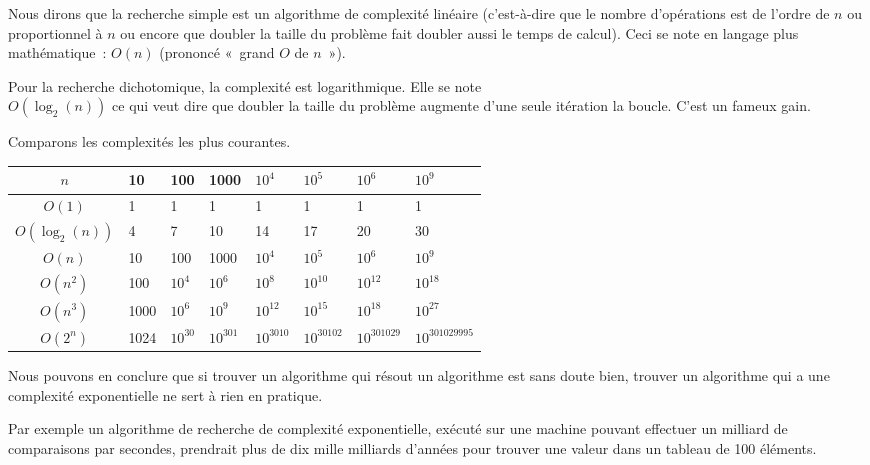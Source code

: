 			Nous dirons que la recherche simple est un algorithme de complexité
			linéaire (c’est-à-dire que le nombre d’opérations est de l’ordre de
			$n$ ou proportionnel à $n$ ou encore que doubler la taille du
			problème fait doubler aussi le temps de calcul). Ceci se note en
			langage plus mathématique~: \textbf{$O(n)$} (prononcé «~grand $O$ de
			$n$~»). 
			
			Pour la recherche dichotomique, la complexité est logarithmique.
			Elle se note \\$O(\log_2(n))$ ce qui veut dire que doubler la taille
			du problème augmente d'une seule itération la boucle. C'est un
			fameux gain. 
			
			Comparons les complexités les plus courantes.
			\begin{center}
			\small
			\begin{tabular}{|c|l|l|l|l|l|l|l|}
			\hline
			\rowcolor{black!40}
			$n$ & 10 & 100 & 1000 & $10^4$ & $10^5$ & $10^6$ & $10^9$ \\
			\hline
			$O(1)$ & 1 & 1 & 1 & 1 & 1 & 1 & 1\\
			\hline
			$O(\log_2(n))$ & 4 & 7 & 10 & 14 & 17 & 20 & 30\\
			\hline
			$O(n)$ & 10 & 100 & 1000 & $10^4$ & $10^5$ & $10^6$ & $10^9$ \\
			\hline
			$O(n^2)$ & 100 & $10^4$ & $10^6$ & $10^8$ & $10^10$ & $10^{12}$ & $10^{18}$ \\
			\hline
			$O(n^3)$ & 1000 & $10^6$ & $10^9$ & $10^{12}$ & $10^{15}$ & $10^{18}$ & $10^{27}$ \\
			\hline
			$O(2^n)$ & 1024 & $10^{30}$ & $10^{301}$ & $10^{3010}$ & $10^{30102}$ 
			& $10^{301029}$ & {\tiny $10^{301029995}$} \\
			\hline
			\end{tabular}
			\end{center}
		
			Nous pouvons en conclure que si trouver un algorithme qui résout un
			algorithme est sans doute bien, trouver un algorithme qui a une
			complexité exponentielle ne sert à rien en pratique. 

			Par exemple un algorithme de recherche de complexité exponentielle,
			exécuté sur une machine pouvant effectuer un milliard de
			comparaisons par secondes, prendrait plus de dix mille milliards
			d’années pour trouver une valeur dans un tableau de 100 éléments.
